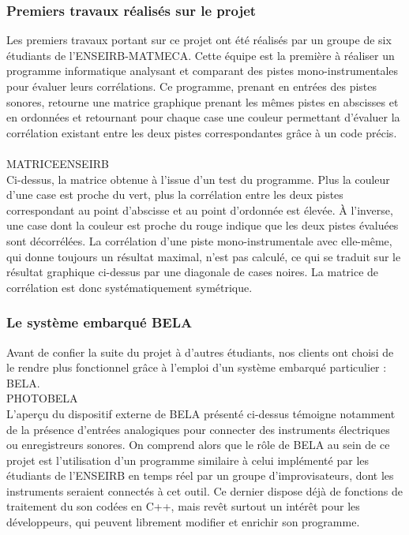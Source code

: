 \subsubsection{Premiers travaux réalisés sur le projet}
Les premiers travaux portant sur ce projet ont été réalisés par un
groupe de six étudiants de l'ENSEIRB-MATMECA. Cette équipe est la
première à réaliser un programme informatique analysant et comparant
des pistes mono-instrumentales pour évaluer leurs corrélations. Ce
programme, prenant en entrées des pistes sonores, retourne une matrice
graphique prenant les mêmes pistes en abscisses et en ordonnées et
retournant pour chaque case une couleur permettant d'évaluer la
corrélation existant entre les deux pistes correspondantes grâce à un
code précis. \\
\\
MATRICEENSEIRB
\\
Ci-dessus, la matrice obtenue à l'issue d'un test du programme. Plus
la couleur d'une case est proche du vert, plus la corrélation entre
les deux pistes correspondant au point d'abscisse et au point
d'ordonnée est élevée. À l'inverse, une case dont la couleur est
proche du rouge indique que les deux pistes évaluées sont
décorrélées. La corrélation d'une piste mono-instrumentale avec
elle-même, qui donne toujours un résultat maximal, n'est pas calculé,
ce qui se traduit sur le résultat graphique ci-dessus par une
diagonale de cases noires. La matrice de corrélation est donc
systématiquement symétrique.

\subsubsection{Le système embarqué BELA}
Avant de confier la suite du projet à d'autres étudiants, nos clients
ont choisi de le rendre plus fonctionnel grâce à l'emploi d'un système
embarqué particulier : BELA. \\ PHOTOBELA \\ L'aperçu du dispositif
externe de BELA présenté ci-dessus témoigne notamment de la présence
d'entrées analogiques pour connecter des instruments électriques ou
enregistreurs sonores. On comprend alors que le rôle de BELA au sein
de ce projet est l'utilisation d'un programme similaire à celui
implémenté par les étudiants de l'ENSEIRB en temps réel par un groupe
d'improvisateurs, dont les instruments seraient connectés à cet
outil. Ce dernier dispose déjà de fonctions de traitement du son
codées en C++, mais revêt surtout un intérêt pour les développeurs,
qui peuvent librement modifier et enrichir son programme.

